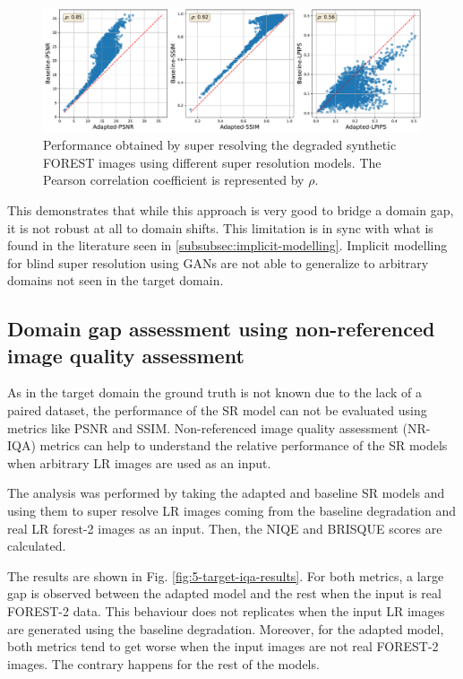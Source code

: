         \begin{figure}[H]
            \centering
            \includegraphics[scale=0.38]{Includes/5-target-prediction-with-domain-gap-dataset.pdf}
            \caption{Performance obtained by super resolving the degraded synthetic FOREST images using different super resolution models. The Pearson correlation coefficient is represented by $\rho$.}
            \label{fig:5-target-prediction-with-domain-gap-dataset}
        \end{figure}
        
        
    This demonstrates that while this approach is very good to bridge a domain gap, it is not robust at all to domain shifts. 
    This limitation is in sync with what is found in the literature seen in \ref{subsubsec:implicit-modelling}. Implicit modelling for blind super resolution using GANs are not able to generalize to arbitrary domains not seen in the target domain.

    \subsection{Domain gap assessment using non-referenced image quality assessment}

    As in the target domain the ground truth is not known due to the lack of a paired dataset, the performance of the SR model can not be evaluated using metrics like PSNR and SSIM.
    Non-referenced image quality assessment (NR-IQA) metrics can help to understand the relative performance of the SR models when arbitrary LR images are used as an input.
    
    The analysis was performed by taking the adapted and baseline SR models and using them to super resolve LR images coming from the baseline degradation and real LR forest-2 images as an input.
    Then, the NIQE and BRISQUE scores are calculated.
    
    The results are shown in Fig. \ref{fig:5-target-iqa-results}.
    For both metrics, a large gap is observed between the adapted model and the rest when the input is real FOREST-2 data.
    This behaviour does not replicates when the input LR images are generated using the baseline degradation. Moreover, for the adapted model, both metrics tend to get worse when the input images are not real FOREST-2 images. The contrary happens for the rest of the models.


